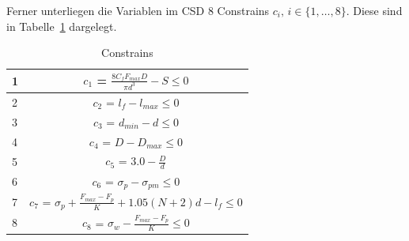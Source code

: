 \documentclass[fontsize=12, a4aper]{scrartcl}
\begin{document}
	\noindent Ferner unterliegen die Variablen im CSD 8 Constrains \(c_i, \, i \in \{1, \dots, 8\}\). Diese sind in Tabelle~\ref{table:variable_restrict} dargelegt.
	
	\begin{table}[H]
		
		\fontsize{12pt}{12pt}
		
		\caption{Constrains}
		
		\label{table:variable_restrict}
		
		\begin{center}
			
			\def\arraystretch{1.5}
			
			\begin{tabular}{| l | c |}
				
				\hline
				
				1 & \(c_1\) = \(\frac{8 C_f F_{max} D}{\pi d^3} - S \leq 0\)\\
				
				\hline
				
				2 & \(c_2\) = \(l_f - l_{max} \leq 0\)\\
				
				\hline
				
				3 & \(c_3\) = \(d_{min} - d \leq 0\)\\
				
				\hline
				
				4 & \(c_4\) = \(D - D_{max} \leq 0\)\\
				
				\hline
				
				5 & \(c_5\) = \(3.0 - \frac{D}{d}\)\\
				
				\hline
				
				6 & \(c_6\) = \(\sigma_p - \sigma_{pm} \leq 0\)\\
				
				\hline
				
				7 & \(c_7\) = \(\sigma_p + \frac{F_{max} - F_p}{K} + 1.05 (N + 2) d - l_f \leq 0\)\\
				
				\hline
				
				8 & \(c_8\) = \(\sigma_{w} - \frac{F_{max} - F_p}{K} \leq 0\)\\
				
				\hline
				
			\end{tabular}
			
		\end{center}
		
	\end{table}
	
\end{document}
